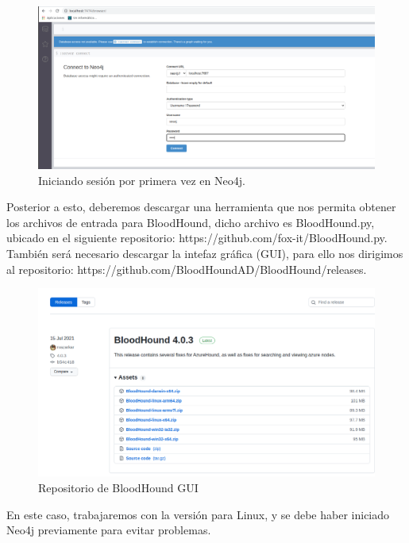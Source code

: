 \documentclass{article}
\begin{document}
\begin{figure}[H]
	\center
	\includegraphics[width=\textwidth]{images/forest/primeraconexionNeo4j.png}
	\caption{Iniciando sesión por primera vez en Neo4j.}
\end{figure}

Posterior a esto, deberemos descargar una herramienta que nos permita obtener los archivos de entrada para BloodHound, dicho archivo es BloodHound.py, ubicado en el siguiente repositorio: https://github.com/fox-it/BloodHound.py.
También será necesario descargar la intefaz gráfica (GUI), para ello nos dirigimos al repositorio: https://github.com/BloodHoundAD/BloodHound/releases. 

\begin{figure}[H]
	\center
	\includegraphics[width=\textwidth]{images/forest/descargando-elgui.png}
	\caption{Repositorio de BloodHound GUI}
\end{figure}

En este caso, trabajaremos con la versión para Linux, y se debe haber iniciado Neo4j previamente para evitar problemas. 
\end{document}
